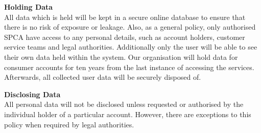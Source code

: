 \textbf{Holding Data}\\
All data which is held will be kept in a secure online database to ensure that there is no risk of exposure or leakage. Also, as a general policy, only authorised SPCA have access to any personal details, such as account holders, customer service teams and legal authorities. Additionally only the user will be able to see their own data held within the system. Our organisation will hold data for consumer accounts for ten years from the last instance of accessing the services. Afterwards, all collected user data will be securely disposed of.

\textbf{Disclosing Data}\\
All personal data will not be disclosed unless requested or authorised by the individual holder of a particular account. However, there are exceptions to this policy when required by legal authorities.


